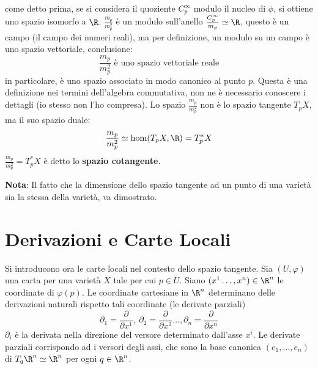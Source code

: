 \documentclass[10pt, letterpaper]{report}
\begin{document}
come detto prima, se si considera il quoziente  $C_p^\infty$ modulo il nucleo di $\phi$, si ottiene uno spazio isomorfo a $\R$. $\frac{m_p}{m_p^2}$ è un modulo sull'anello $\frac{C_p^\infty}{m_p}\simeq \R$, questo è un campo (il campo dei numeri reali), ma per definizione, un modulo su un campo è uno spazio vettoriale, conclusione:\begin{equation}
    \frac{m_p}{m_p^2}\text{ è uno spazio vettoriale reale}
\end{equation}
in particolare, è uno spazio associato in modo canonico al punto $p$. Questa è una definizione nei termini dell'algebra commutativa, non ne è necessario conoscere i dettagli (io stesso non l'ho compresa). Lo spazio $\frac{m_p}{m_p^2}$ non è lo spazio tangente $T_pX$, ma il suo spazio duale:\begin{equation}
     \frac{m_p}{m_p^2}\simeq \hom(T_pX,\R)=T_p^*X
\end{equation}
$ \frac{m_p}{m_p^2}=T_p^*X$ è detto lo \textbf{spazio cotangente}.\bigskip


\noindent\textbf{Nota}: Il fatto che la dimensione dello spazio tangente ad un punto di una varietà sia la stessa della varietà, va dimostrato.
\section{Derivazioni e Carte Locali}
Si introducono ora le carte locali nel contesto dello spazio tangente. Sia $(U,\varphi)$ una carta per una varietà $X$ tale per cui $p\in U$. Siano $(x^1\dots,x^n)\in\R^n$ le coordinate di $\varphi(p)$. Le coordinate cartesiane in $\R^n$ determinano delle derivazioni naturali rispetto tali coordinate (le derivate parziali)\begin{equation}
    \partial_1=\frac{\partial}{\partial x^1}, \ \partial_2=\frac{\partial}{\partial x^2}\dots,\partial_n=\frac{\partial}{\partial x^n}
\end{equation}
$\partial_i$ è la derivata nella direzione del versore determinato dall'asse $x^i$. Le derivate parziali corrispondo ad i versori degli assi, che sono la base canonica $(e_1,\dots,e_n)$ di $T_q\R^n\simeq\R^n$ per ogni $q\in\R^n$.\bigskip
\end{document}
